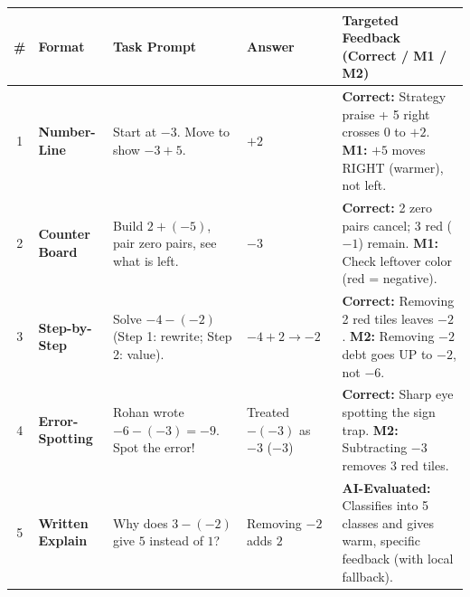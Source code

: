 \documentclass[10pt,a4paper]{article}
\begin{document}
\begin{tabularx}{\linewidth}{@{}c l X l X@{}}
\toprule
\textbf{\#} & \textbf{Format} & \textbf{Task Prompt} & \textbf{Answer} & \textbf{Targeted Feedback (Correct / M1 / M2)} \\
\midrule
1 & \textbf{Number-Line} & Start at $-3$. Move to show $-3 + 5$. & $+2$ & \textbf{Correct:} Strategy praise + 5 right crosses $0$ to $+2$. \textbf{M1:} $+5$ moves RIGHT (warmer), not left. \\
2 & \textbf{Counter Board} & Build $2 + (-5)$, pair zero pairs, see what is left. & $-3$ & \textbf{Correct:} 2 zero pairs cancel; 3 red ($-1$) remain. \textbf{M1:} Check leftover color (red = negative). \\
3 & \textbf{Step-by-Step} & Solve $-4 - (-2)$ (Step 1: rewrite; Step 2: value). & $-4+2 \to -2$ & \textbf{Correct:} Removing 2 red tiles leaves $-2$. \textbf{M2:} Removing $-2$ debt goes UP to $-2$, not $-6$. \\
4 & \textbf{Error-Spotting} & Rohan wrote $-6 - (-3) = -9$. Spot the error! & Treated $-(-3)$ as $-3$ ($-3$) & \textbf{Correct:} Sharp eye spotting the sign trap. \textbf{M2:} Subtracting $-3$ removes 3 red tiles. \\
5 & \textbf{Written Explain} & Why does $3 - (-2)$ give $5$ instead of $1$? & Removing $-2$ adds $2$ & \textbf{AI-Evaluated:} Classifies into 5 classes and gives warm, specific feedback (with local fallback). \\
\bottomrule
\end{tabularx}
\end{document}
